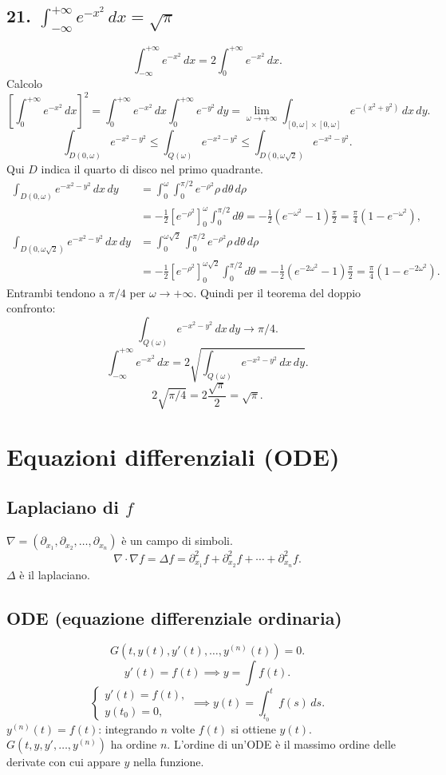 \documentclass[11pt,a4paper]{article}
\begin{document}
\subsection*{21. $\displaystyle\int_{-\infty}^{+\infty}e^{-x^2}\,dx=\sqrt\pi$}
\[\int_{-\infty}^{+\infty}e^{-x^2}\,dx=2\int_0^{+\infty}e^{-x^2}\,dx.\]
Calcolo
\[\left[\int_0^{+\infty}e^{-x^2}\,dx\right]^2=\int_0^{+\infty}e^{-x^2}\,dx\int_0^{+\infty}e^{-y^2}\,dy=\lim_{\omega\to+\infty}\int_{[0,\omega]\times[0,\omega]}e^{-(x^2+y^2)}\,dx\,dy.\]
\[\int_{D(0,\omega)}e^{-x^2-y^2}\le\int_{Q(\omega)}e^{-x^2-y^2}\le\int_{D(0,\omega\sqrt2)}e^{-x^2-y^2}.\]
Qui $D$ indica il quarto di disco nel primo quadrante.
\begin{align*}
\int_{D(0,\omega)}e^{-x^2-y^2}\,dx\,dy&=\int_0^\omega\int_0^{\pi/2}e^{-\rho^2}\rho\,d\theta\,d\rho\\
&=-\tfrac12[e^{-\rho^2}]_0^\omega\int_0^{\pi/2}d\theta
=-\tfrac12(e^{-\omega^2}-1)\tfrac\pi2=\tfrac\pi4(1-e^{-\omega^2}),\\
\int_{D(0,\omega\sqrt2)}e^{-x^2-y^2}\,dx\,dy&=\int_0^{\omega\sqrt2}\int_0^{\pi/2}e^{-\rho^2}\rho\,d\theta\,d\rho\\
&=-\tfrac12[e^{-\rho^2}]_0^{\omega\sqrt2}\int_0^{\pi/2}d\theta
=-\tfrac12(e^{-2\omega^2}-1)\tfrac\pi2=\tfrac\pi4(1-e^{-2\omega^2}).
\end{align*}
Entrambi tendono a $\pi/4$ per $\omega\to+\infty$. Quindi per il teorema del doppio confronto:
\[\int_{Q(\omega)}e^{-x^2-y^2}\,dx\,dy\to\pi/4.\]
\[\int_{-\infty}^{+\infty}e^{-x^2}\,dx=2\sqrt{\int_{Q(\omega)}e^{-x^2-y^2}\,dx\,dy}.\]\[2\sqrt{\pi/4}=2\frac{\sqrt\pi}2=\sqrt\pi.\]
\section*{Equazioni differenziali (ODE)}
\subsection*{Laplaciano di $f$}
$\nabla=(\partial_{x_1},\partial_{x_2},\ldots,\partial_{x_n})$ è un campo di simboli.
\[\nabla\cdot\nabla f=\Delta f=\partial_{x_1}^2f+\partial_{x_2}^2f+\cdots+\partial_{x_n}^2f.\]
$\Delta$ è il laplaciano.
\subsection*{ODE (equazione differenziale ordinaria)}
\[G(t,y(t),y'(t),\ldots,y^{(n)}(t))=0.\]
\[y'(t)=f(t)\implies y=\int f(t).\]
\[\begin{cases}y'(t)=f(t),\\y(t_0)=0,\end{cases}\implies y(t)=\int_{t_0}^t f(s)\,ds.\]
$y^{(n)}(t)=f(t)$: integrando $n$ volte $f(t)$ si ottiene $y(t)$.
$G(t,y,y',\ldots,y^{(n)})$ ha ordine $n$. L'ordine di un'ODE è il massimo ordine delle derivate con cui appare $y$ nella funzione.
\end{document}

